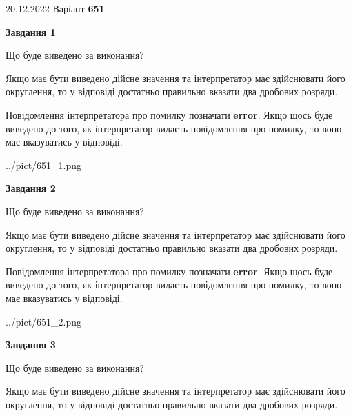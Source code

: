 \documentclass[12pt, ukrainian]{article}
\begin{document}
{20.12.2022 Варіант \No \textbf { 651 }\par}
{
\begin {Large}

{\begin {center}\textbf{Завдання 1}\end {center}}\par
Що буде виведено за виконання? \par

Якщо має бути виведено дійсне значення та інтерпретатор має здійснювати його округлення, 
то у відповіді достатньо правильно вказати два дробових розряди.

Повідомлення інтерпретатора про помилку позначати \textbf{error}.
Якщо щось буде виведено до того, як інтерпретатор видасть повідомлення про помилку, 
то воно має вказуватись у відповіді. \par

\begin{center}
	{../pict/651_1.png}
\end{center}
\newpage

{\begin {center}\textbf{Завдання 2}\end {center}}\par
Що буде виведено за виконання? \par

Якщо має бути виведено дійсне значення та інтерпретатор має здійснювати його округлення, 
то у відповіді достатньо правильно вказати два дробових розряди.

Повідомлення інтерпретатора про помилку позначати \textbf{error}.
Якщо щось буде виведено до того, як інтерпретатор видасть повідомлення про помилку, 
то воно має вказуватись у відповіді. \par

\begin{center}
	{../pict/651_2.png}
\end{center}
\newpage

{\begin {center}\textbf{Завдання 3}\end {center}}\par
Що буде виведено за виконання? \par

Якщо має бути виведено дійсне значення та інтерпретатор має здійснювати його округлення, 
то у відповіді достатньо правильно вказати два дробових розряди.


\end{Large}}
\end{document}
